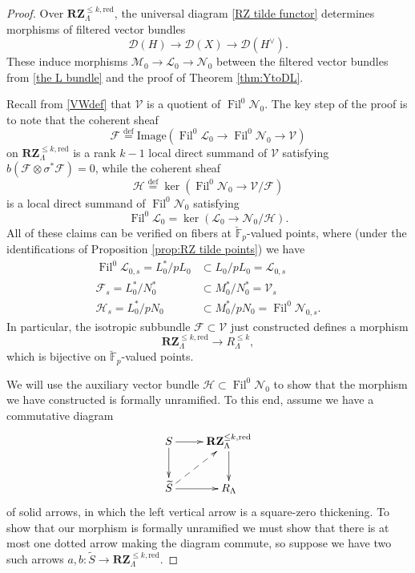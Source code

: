 \documentclass[11pt]{alggeom}
\newcommand{\define}{\stackrel{\mathrm{def}}{=}}
\newcommand{\red}{\mathrm{red}}
\newcommand{\F}{\mathbb F}
\DeclareMathOperator{\Fil}{Fil}
\begin{document}
\begin{proof}
Over $\mathbf{RZ}_\Lambda^{\le k, \red}$, the universal diagram \eqref{RZ tilde functor} determines morphisms of filtered vector bundles
\[
\mathscr{D}(H) \to \mathscr{D}(X) \to \mathscr{D}(H^\vee).
\]
These induce morphisms 
$
 \mathscr{M}_0 \to \mathscr{L}_0 \to \mathscr{N}_0
$
between the filtered vector bundles from  \eqref{the L bundle} and the proof of Theorem \ref{thm:YtoDL}.






Recall from  \eqref{VWdef} that $\mathscr{V}$ is a quotient of $\Fil^0 \mathscr{N}_0$.
The key step of the proof is to note that the coherent sheaf
\[
\mathscr{F} \define \mathrm{Image}( \Fil^0 \mathscr{L}_0 \to  \Fil^0 \mathscr{N}_0 \to   \mathscr{V} )
\]
on $\mathbf{RZ}_\Lambda^{\le k, \red}$ is a rank $k-1$  local direct summand of $\mathscr{V}$ satisfying $b(\mathscr{F} \otimes  \sigma^*\mathscr{F} ) =0$, while  the coherent sheaf
\[
\mathscr{H} \define \ker(  \Fil^0 \mathscr{N}_0 \to \mathscr{V} / \mathscr{F}) 
\]
is a local direct summand of $ \Fil^0 \mathscr{N}_0$ satisfying 
\begin{equation}\label{magic hodge}
\Fil^0 \mathscr{L}_0 = \ker( \mathscr{L}_0 \to \mathscr{N}_0 / \mathscr{H} ) .
\end{equation}
All of these claims  can be verified on fibers at $\breve{\F}_p$-valued points, where (under the identifications of Proposition \ref{prop:RZ tilde points}) we have
\begin{align*}
\Fil^0 \mathscr{L}_{0,s}=  L_0^* / pL_0  &  \subset  L_0/pL_0 = \mathscr{L}_{0,s}  \\
\mathscr{F}_s=  L_0^* / N_0^*  &  \subset  M_0^*/N_0^*  = \mathscr{V}_s  \\
\mathscr{H}_s=  L_0^* / p N_0  &  \subset  M_0^*/p N_0  = \Fil^0 \mathscr{N}_{0,s}.
\end{align*}
In particular,  the isotropic subbundle $\mathscr{F} \subset \mathscr{V}$ just constructed   defines a morphism
\begin{equation}\label{RZtilde is grass}
\mathbf{RZ}_\Lambda^{ \le k, \red }  \to R^{\le k}_\Lambda,
\end{equation}
which is bijective on $\breve{\F}_p$-valued points.

We will use the auxiliary vector bundle $\mathscr{H} \subset \Fil^0 \mathscr{N}_0$ to show  that the morphism we have constructed is formally unramified.  To this end,  assume  we have a commutative diagram
\[
\xymatrix{
{ S }  \ar[r] \ar[d] &  { \mathbf{RZ}_\Lambda^{\le k,\red}  }  \ar[d]  \\
{  \widetilde{S} }  \ar[r] \ar@{-->}[ur] & { R_\Lambda   } 
}
\]
of solid arrows, in which the left vertical arrow is a square-zero thickening.
To show that our morphism is formally unramified we must show that there is at most one dotted arrow making the diagram commute, so suppose we have two such arrows
$
a,b : \widetilde{S} \to \mathbf{RZ}_\Lambda^{ \le k,\red} .
$




\end{proof}
\end{document}
